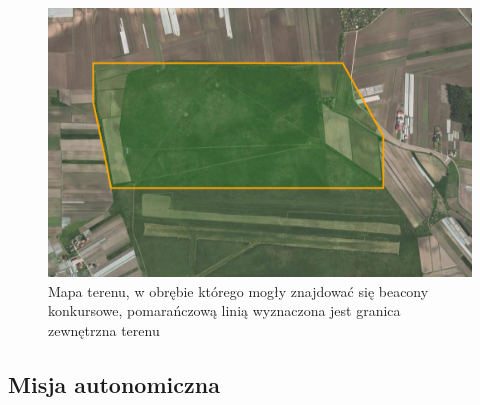 \begin{figure}[!th]
    \centering
    \includegraphics[width=15cm]{zalaczniki/obrazy/teren.png}
    \caption{Mapa terenu, w obrębie którego mogły znajdować się beacony konkursowe, pomarańczową linią wyznaczona jest granica zewnętrzna terenu}
    \label{fig:teren}
\end{figure}

\subsection{Misja autonomiczna}


